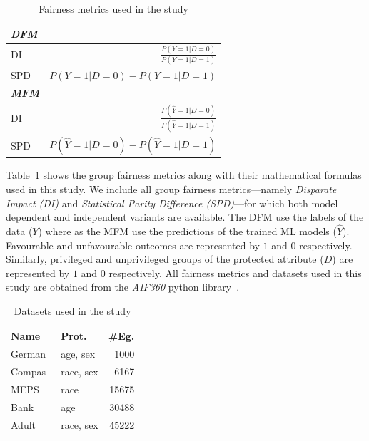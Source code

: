 \documentclass[conference,review,anonymous]{IEEEtran}
\begin{document}
\begin{table}
  \centering
  \caption{Fairness metrics used in the study}
  \begin{tabular}{l r}
    \hline
    \textbf{\emph{DFM}}\\
    \hline
    DI & \(\displaystyle \frac{P(Y=1|D=0)}{P(Y=1|D=1)}\)\\
    SPD & \(\displaystyle P(Y=1|D=0)-P(Y=1|D=1)\)\\
    \hline
    \textbf{\emph{MFM}}\\
    \hline
    DI & \(\displaystyle \frac{P(\hat{Y}=1|D=0)}{P(\hat{Y}=1|D=1)}\)\\
    SPD & \(\displaystyle P(\hat{Y}=1|D=0)-P(\hat{Y}=1|D=1)\)\\
    \hline
  \end{tabular}
  \label{tab:fairness-metrics}
\end{table}

Table \ref{tab:fairness-metrics} shows the group fairness metrics
along with their mathematical formulas used in this study. We include
all group fairness metrics---namely \emph{Disparate Impact (DI)} and
\emph{Statistical Parity Difference (SPD)}---for which both model
dependent and independent variants are available. The DFM use the
labels of the data ($Y$) where as the MFM use the predictions of the
trained ML models ($\hat{Y}$). Favourable and unfavourable outcomes
are represented by $1$ and $0$ respectively. Similarly, privileged and
unprivileged groups of the protected attribute ($D$) are represented
by $1$ and $0$ respectively. All fairness metrics and datasets used in
this study are obtained from the \emph{AIF360} python
library \cite{bellamy2019ai}.

\begin{table}
  \centering
  \caption{Datasets used in the study}
  \begin{tabular}{l l r}
    \hline
    \textbf{Name} & \textbf{Prot.} & \textbf{\#Eg.}\\
    \hline
    German \cite{hofmann1994german} & age, sex & 1000\\
    Compas\cite{angwin2016machine} & race, sex & 6167\\
    MEPS \cite{mepsdata} & race & 15675\\
    Bank\cite{moro2014data} & age & 30488\\
    Adult\cite{kohavi1996scaling} & race, sex & 45222\\
    \hline
  \end{tabular}
  \label{tab:datasets}
\end{table}
\end{document}
